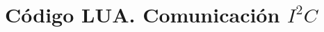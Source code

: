 \clearpage
\thispagestyle{empty}
\mbox{}

\chapter{Código LUA. Comunicación $I^2C$}
\label{apenddixE}

